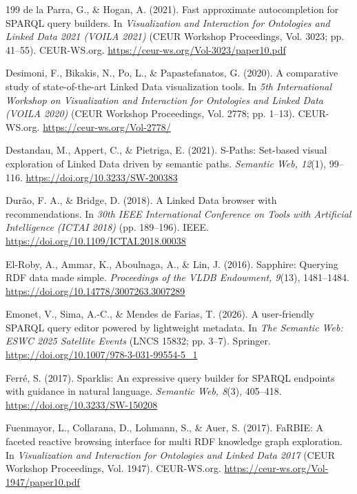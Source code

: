\documentclass[manuscript,review,screen]{acmart}
\begin{document}
\begin{thebibliography}{199}
 de la Parra, G., \& Hogan, A. (2021). Fast approximate autocompletion for SPARQL query builders. In \textit{Visualization and Interaction for Ontologies and Linked Data 2021 (VOILA 2021)} (CEUR Workshop Proceedings, Vol. 3023; pp. 41--55). CEUR-WS.org. \url{https://ceur-ws.org/Vol-3023/paper10.pdf}

 Desimoni, F., Bikakis, N., Po, L., \& Papastefanatos, G. (2020). A comparative study of state-of-the-art Linked Data visualization tools. In \textit{5th International Workshop on Visualization and Interaction for Ontologies and Linked Data (VOILA 2020)} (CEUR Workshop Proceedings, Vol. 2778; pp. 1--13). CEUR-WS.org. \url{https://ceur-ws.org/Vol-2778/}

 Destandau, M., Appert, C., \& Pietriga, E. (2021). S-Paths: Set-based visual exploration of Linked Data driven by semantic paths. \textit{Semantic Web, 12}(1), 99--116. \url{https://doi.org/10.3233/SW-200383}

 Dur\~{a}o, F. A., \& Bridge, D. (2018). A Linked Data browser with recommendations. In \textit{30th IEEE International Conference on Tools with Artificial Intelligence (ICTAI 2018)} (pp. 189--196). IEEE. \url{https://doi.org/10.1109/ICTAI.2018.00038}

 El-Roby, A., Ammar, K., Aboulnaga, A., \& Lin, J. (2016). Sapphire: Querying RDF data made simple. \textit{Proceedings of the VLDB Endowment, 9}(13), 1481--1484. \url{https://doi.org/10.14778/3007263.3007289}

 Emonet, V., Sima, A.-C., \& Mendes de Farias, T. (2026). A user-friendly SPARQL query editor powered by lightweight metadata. In \textit{The Semantic Web: ESWC 2025 Satellite Events} (LNCS 15832; pp. 3--7). Springer. \url{https://doi.org/10.1007/978-3-031-99554-5_1}

 Ferr\'{e}, S. (2017). Sparklis: An expressive query builder for SPARQL endpoints with guidance in natural language. \textit{Semantic Web, 8}(3), 405--418. \url{https://doi.org/10.3233/SW-150208}

 Fuenmayor, L., Collarana, D., Lohmann, S., \& Auer, S. (2017). FaRBIE: A faceted reactive browsing interface for multi RDF knowledge graph exploration. In \textit{Visualization and Interaction for Ontologies and Linked Data 2017} (CEUR Workshop Proceedings, Vol. 1947). CEUR-WS.org. \url{https://ceur-ws.org/Vol-1947/paper10.pdf}


\end{thebibliography}
\end{document}
